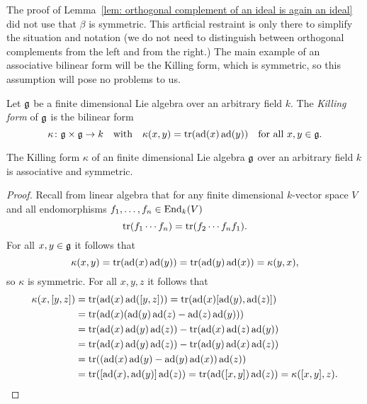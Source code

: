 \begin{rem}
 The proof of Lemma~\ref{lem: orthogonal complement of an ideal is again an ideal} did not use that $\beta$ is symmetric. This artficial restraint is only there to simplify the situation and notation (we do not need to distinguish between orthogonal complements from the left and from the right.) The main example of an associative bilinear form will be the Killing form, which is symmetric, so this assumption will pose no problems to us.
\end{rem}


\begin{defi}
 Let $\mathfrak{g}$ be a finite dimensional Lie algebra over an arbitrary field $k$. The \emph{Killing form} of $\mathfrak{g}$ is the bilinear form
 \[
  \kappa \colon \mathfrak{g} \times \mathfrak{g} \to k
  \quad\text{with}\quad
  \kappa(x,y) = \operatorname{tr}(\operatorname{ad}(x) \operatorname{ad}(y))
  \quad\text{for all $x,y \in \mathfrak{g}$}.
 \]
\end{defi}


\begin{lem}\label{lem: killing form is associative and symmetric}
 The Killing form $\kappa$ of an finite dimensional Lie algebra $\mathfrak{g}$ over an arbitrary field $k$ is associative and symmetric.
\end{lem}
\begin{proof}
 Recall from linear algebra that for any finite dimensional $k$-vector space $V$ and all endomorphisms $f_1, \dotsc, f_n \in \operatorname{End}_k(V)$
 \[
  \operatorname{tr}(f_1 \dotsm f_n) = \operatorname{tr}(f_2 \dotsm f_n f_1).
 \]
 For all $x,y \in \mathfrak{g}$ it follows that
 \[
  \kappa(x,y) = \operatorname{tr}(\operatorname{ad}(x) \operatorname{ad}(y)) = \operatorname{tr}(\operatorname{ad}(y) \operatorname{ad}(x)) = \kappa(y,x),
 \]
 so $\kappa$ is symmetric. For all $x,y,z$ it follows that
 \begin{align*}
  \kappa(x,[y,z])
  &= \operatorname{tr}(\operatorname{ad}(x) \operatorname{ad}([y,z]))
  = \operatorname{tr}(\operatorname{ad}(x) [\operatorname{ad}(y), \operatorname{ad}(z)]) \\
  &= \operatorname{tr}(\operatorname{ad}(x) (\operatorname{ad}(y) \operatorname{ad}(z) - \operatorname{ad}(z) \operatorname{ad}(y))) \\
  &= \operatorname{tr}(\operatorname{ad}(x) \operatorname{ad}(y) \operatorname{ad}(z)) - \operatorname{tr}(\operatorname{ad}(x) \operatorname{ad}(z) \operatorname{ad}(y)) \\
  &= \operatorname{tr}(\operatorname{ad}(x) \operatorname{ad}(y) \operatorname{ad}(z)) - \operatorname{tr}(\operatorname{ad}(y) \operatorname{ad}(x) \operatorname{ad}(z)) \\
  &= \operatorname{tr}((\operatorname{ad}(x) \operatorname{ad}(y)- \operatorname{ad}(y) \operatorname{ad}(x)) \operatorname{ad}(z)) \\
  &= \operatorname{tr}([\operatorname{ad}(x), \operatorname{ad}(y)] \operatorname{ad}(z))
  = \operatorname{tr}(\operatorname{ad}([x,y]) \operatorname{ad}(z))
  = \kappa([x,y],z).
 \qedhere
 \end{align*}
\end{proof}


